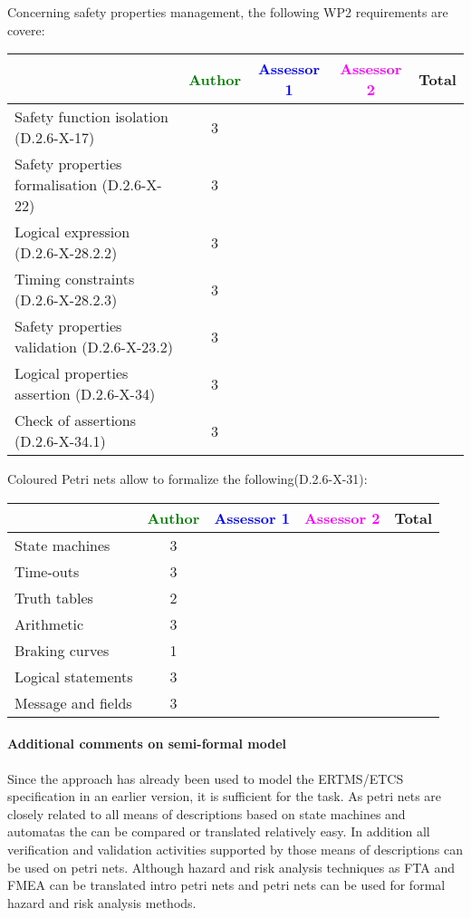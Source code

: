 Concerning safety properties management, the following WP2 requirements are covere:

\begin{tabular}{|l | c | c | c | c|}
\hline
& \textcolor{green}{Author} & \textcolor{blue}{Assessor 1} & \textcolor{magenta}{Assessor 2} & Total \\
\hline 
Safety function isolation (D.2.6-X-17)  & 3 & & &  \\
\hline 
Safety properties formalisation (D.2.6-X-22)  & 3 & & &  \\
\hline
Logical expression (D.2.6-X-28.2.2)  & 3 & & &  \\
\hline
Timing constraints (D.2.6-X-28.2.3)  & 3 & & &  \\
\hline
Safety properties validation (D.2.6-X-23.2)  & 3 & & &  \\
\hline
Logical properties assertion (D.2.6-X-34)  & 3 & & &  \\
\hline
Check  of assertions (D.2.6-X-34.1)  & 3 & & &  \\
\hline
\end{tabular}

Coloured Petri nets allow to  formalize the following(D.2.6-X-31):

\begin{tabular}{|l | c | c | c | c|}
\hline
& \textcolor{green}{Author} & \textcolor{blue}{Assessor 1} & \textcolor{magenta}{Assessor 2} & Total \\
\hline 
State machines  & 3 & & &  \\
\hline
Time-outs  & 3 & & &  \\
\hline
Truth tables  & 2 & & &  \\
\hline
Arithmetic  & 3 & & &  \\
\hline
Braking curves  & 1 & & &  \\
\hline
Logical statements & 3 & & &  \\
\hline
Message and fields & 3 & & &  \\
\hline
\end{tabular}

\paragraph{Additional comments on semi-formal  model} 
Since the approach has already been used to model the ERTMS/ETCS specification in an earlier version, it is sufficient for the task.
As petri nets are closely related to all means of descriptions based on state machines and automatas the can be compared or translated relatively easy. In addition all verification and validation activities supported by those means of descriptions can be used on petri nets. Although hazard and risk analysis techniques as FTA and FMEA can be translated intro petri nets and petri nets can be used for formal hazard and risk analysis methods.


